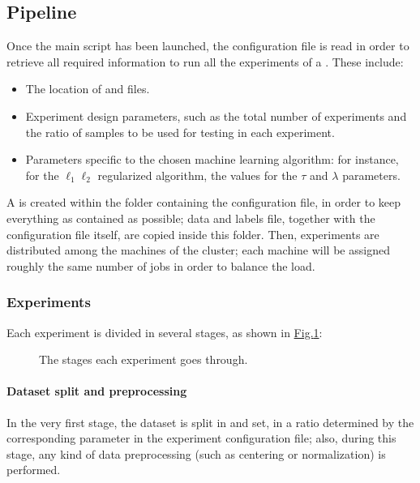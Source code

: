 \documentclass[letterpaper,10pt,english]{sphinxmanual}
\begin{document}
\subsection{Pipeline}
\label{\detokenize{framework:pipeline}}\label{\detokenize{framework:id1}}
Once the main script has been launched, the configuration file is read in order to retrieve all required information to run all the experiments of a  . These include:
\begin{itemize}
\item {} 
The location of  and  files.

\item {} 
Experiment design parameters, such as the total number of experiments and the ratio of samples to be used for testing in each experiment.

\item {} 
Parameters specific to the chosen machine learning algorithm: for instance, for the \(\ell_1 \ell_2\) regularized algorithm, the values for the \(\tau\) and \(\lambda\) parameters.

\end{itemize}

A  is created within the folder containing the configuration file, in order to keep everything as contained as possible; data and labels file, together with the configuration file itself, are copied inside this folder. Then, experiments are distributed among the machines of the cluster; each machine will be assigned roughly the same number of jobs in order to balance the load.


\subsubsection{Experiments}
\label{\detokenize{framework:experiments}}
Each experiment is divided in several stages, as shown in \hyperref[\detokenize{framework:experiment-stages}]{Fig.\@ \ref{\detokenize{framework:experiment-stages}}}:
\begin{figure}[htbp]
\centering
\capstart

\noindent{}
\caption{The stages each experiment goes through.}\label{\detokenize{framework:experiment-stages}}\end{figure}


\paragraph{Dataset split and preprocessing}
\label{\detokenize{framework:dataset-split-and-preprocessing}}
In the very first stage, the dataset is split in  and  set, in a ratio determined by the corresponding parameter in the experiment configuration file; also, during this stage, any kind of data preprocessing (such as centering or normalization) is performed.
\end{document}
